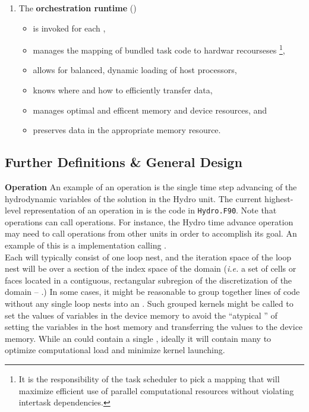 \documentclass{article}
\begin{document}
\begin{enumerate}
\begin{itemize}
    \end{itemize}
\item{The \textbf{orchestration runtime} (\textbf{\shortOR})}
    \begin{itemize}
    \item{is invoked for each \actionroutinebundle,}
    \item{manages the mapping of bundled task code to hardwar recourseses \footnote{It is the responsibility of the task
    scheduler to pick a mapping that will maximize efficient use of parallel
    computational resources without violating intertask dependencies.},}
    \item{allows for balanced, dynamic loading of host processors,}
    \item{knows where and how to efficiently transfer data,}
    \item{manages optimal and efficent  memory and device resources, and}
    \item{preserves data in the appropriate memory resource.}
    \end{itemize}
\end{enumerate}

\subsection{Further Definitions \& General Design}
\label{sec:Definitions}
\textbf{Operation} An example of an operation is the single time step advancing of the hydrodynamic
variables of the solution in the Hydro unit. The current highest-level
representation of an operation in \FlashOfTheFuture is the
code in \texttt{Hydro.F90}.  Note that operations can call operations.  For
instance, the Hydro time advance operation may need to call operations from other units
in order to accomplish its goal.  An example of this is a 
implementation calling .\\

Each \ULKR will typically consist of one loop nest, and the iteration space of
the loop nest will be over a section of the index space of the domain
(\textit{i.e.} a set of cells or faces located in a contiguous, rectangular
subregion of the discretization of the domain --
\cellloopnest.)  In some cases, it might be reasonable to group
together lines of code without any single loop nests into an \ULKR.
Such grouped kernels might be called to set the values of variables in the
device memory to avoid the ``atypical \ULKR'' of
setting the variables in the host memory and transferring the values to the
device memory. While an \OLAR could
contain a single \ULKR, ideally it will contain many to optimize computational load
and minimize kernel launching.
\end{document}
